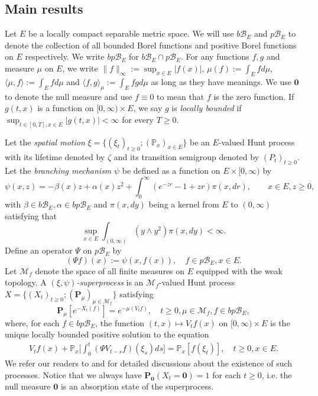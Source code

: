 \documentclass[UTF8]{pkuthss}
\theoremstyle{plain}
\theoremstyle{definition}
\numberwithin{equation}{section}
\begin{document}
\subsection{Main results}	
\label{sec: Main results}
	Let $E$ be a locally compact separable metric space.
	We will use $b\mathscr B_E$ and $p\mathscr B_E$ to denote the collection of all bounded Borel functions and positive Borel functions on $E$ respectively.
	We write $bp\mathscr B_E$ for $b\mathscr B_E \cap p\mathscr B_E$.
	For any functions $f,g$ and measure $\mu$ on $E$, we write $\|f\|_\infty := \sup_{x\in E} |f(x)|$, $\mu(f) := \int_E f d\mu$, $\langle \mu,f \rangle := \int_E f d\mu$ and $\langle f,g \rangle_\mu := \int_E fg d\mu$ as long as they have meanings.
	We use $\mathbf 0$ to denote the null measure and use $f\equiv 0$ to mean that $f$ is the zero function.
	If $g(t,x)$ is a function on $[0,\infty)\times E$, we say $g$ is \emph{locally bounded} if $\sup_{t\in [0,T],x\in E} |g(t,x)|<\infty$ for every $T\geq 0$.

	Let the \emph{spatial motion} $\xi=\{(\xi_t)_{t\geq 0};(\mathbb P_x)_{x\in E}\}$ be an $E$-valued Hunt process with its lifetime denoted by $\zeta$ and its transition semigroup denoted by $(P_t)_{t\geq 0}$.
Let the \emph{branching mechanism} $\psi$ be defined as a function on $E\times[0,\infty)$ by
\[
  \psi(x,z) 
  = -\beta(x)z + \alpha(x)z^2+\int_0^\infty (e^{-zr}-1+zr )\pi(x, dr),
  \qquad x\in E, z\geq0,
\]
with $\beta\in b\mathscr B_E,\alpha\in bp\mathscr B_E$ and $\pi(x,dy)$ being a kernel from $E$ to $(0,\infty)$ satisfying that \[\sup_{x\in E} \int_{(0,\infty)} (y\wedge y^2) \pi(x,dy) < \infty.\]
Define an operator $\Psi$ on $p\mathscr B_E$ by
\[
	(\Psi f) (x)
	:= \psi(x,f(x)),
	\quad f\in p\mathscr B_E, x\in E.
\]
Let $\mathcal M_f$ denote the space of all finite measures on $E$ equipped with the weak topology.
A \emph{$(\xi,\psi)$-superprocess} is an $\mathcal M_f$-valued Hunt process
	$X=\{(X_t)_{t\geq 0}; (\mathbf P_\mu)_{\mu \in \mathcal M_f}\}$ satisfying
\begin{equation}
\label{eq: Defi of Vt}
  \mathbf P_\mu [e^{-X_t(f)}] = e^{-\mu(V_tf)},
  \quad t\geq 0, \mu \in \mathcal M_f, f\in bp\mathscr B_E,
\end{equation}
  where, for each $f\in bp\mathscr B_E$, the function $(t,x) \mapsto V_tf(x)$ on $[0,\infty) \times E$ is the unique locally bounded positive solution to the equation
\begin{align}\label{eq: chap 3 FKPP_in_definition}
  	V_t f(x) + \mathbb P_x \Big[ \int_0^t (\Psi V_{t-s} f)(\xi_s) ds \Big]
	=\mathbb P_x[f(\xi_t)], \quad t \geq 0, x\in E.
\end{align}
	We refer our readers to \cite{Dawson1993Measure-valued, Dynkin1993Superprocesses}
	and \cite[Section 2.3 \& Theorem 5.11]{Li2011Measure-valued}
	for detailed discussions about the existence of such processes.
	Notice that we always have $\mathbf P_{\mathbf 0}(X_t = \mathbf 0) = 1$ for each $t\geq 0$, i.e. the null measure $\mathbf 0$ is an absorption state of the superprocess.
\end{document}
